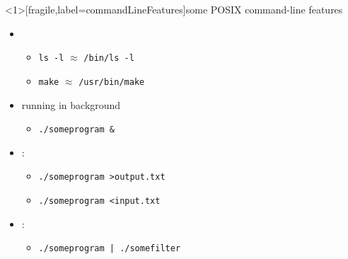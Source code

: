 \begin{frame}<1>[fragile,label=commandLineFeatures]{some POSIX command-line features}
\begin{itemize}
\item {}
    \begin{itemize}
    \item \verb|ls -l| $\approx$ \verb|/bin/ls -l|
    \item \verb|make| $\approx$ \verb|/usr/bin/make|
    \end{itemize}
\item running in background
    \begin{itemize}
    \item \verb|./someprogram &|
    \end{itemize}
\item {}:
    \begin{itemize}
    \item \verb|./someprogram >output.txt|
    \item \verb|./someprogram <input.txt|
    \end{itemize}
\item {}:
    \begin{itemize}
    \item \verb!./someprogram | ./somefilter!
    \end{itemize}
\end{itemize}
\end{frame}


